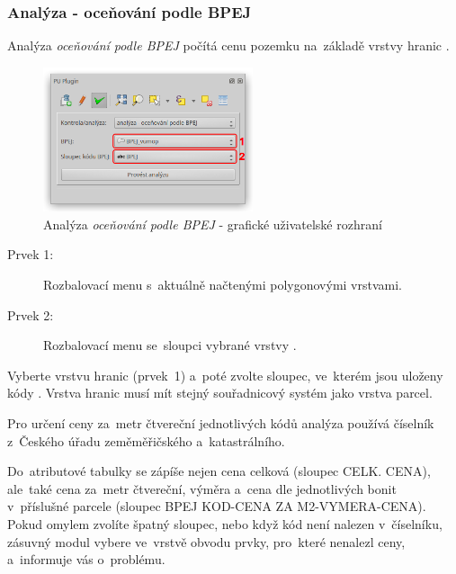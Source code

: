 \subsubsection{Analýza - oceňování podle BPEJ}
\label{manual_analyza_bpej}

Analýza \textit{oceňování podle BPEJ} počítá cenu pozemku na~základě vrstvy hranic .

	\begin{figure}[H]
		\centering
		\includegraphics[width=0.55\textwidth]{./pictures/analyza_bpej.png}
		\caption[Analýza \textit{oceňování podle BPEJ} - grafické uživatelské rozhraní]{Analýza \textit{oceňování podle BPEJ} - grafické uživatelské rozhraní}
		\label{fig:manual_analyza_bpej_gui}
 	\end{figure}

\begin{description}
	\item[Prvek 1:] Rozbalovací menu s~aktuálně načtenými polygonovými vrstvami.
	\item[Prvek 2:] Rozbalovací menu se~sloupci vybrané vrstvy .
\end{description}

Vyberte vrstvu hranic  (prvek~1) a~poté zvolte sloupec, ve~kterém jsou uloženy kódy . Vrstva hranic  musí mít stejný souřadnicový systém jako vrstva parcel.

Pro určení ceny za~metr čtvereční jednotlivých kódů  analýza používá číselník  z~Českého úřadu zeměměřičského a~katastrálního.

Do~atributové tabulky se zápíše nejen cena celková (sloupec CELK. CENA), ale~také cena za~metr čtvereční, výměra a~cena dle jednotlivých bonit v~příslušné parcele (sloupec  BPEJ KOD-CENA ZA M2-VYMERA-CENA). Pokud omylem zvolíte špatný sloupec, nebo když kód  není nalezen v~číselníku, zásuvný modul vybere ve~vrstvě obvodu prvky, pro~které nenalezl ceny, a~informuje vás o~problému.
